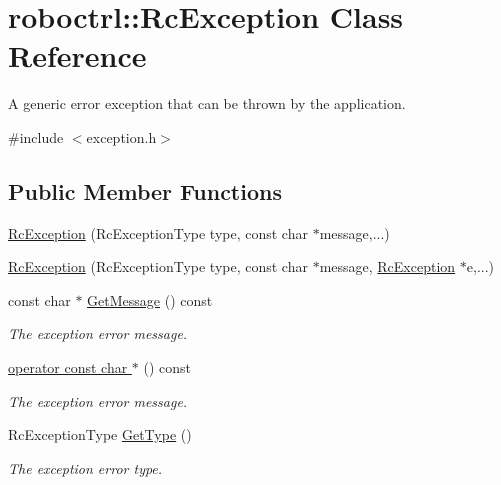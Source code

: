 \hypertarget{classroboctrl_1_1_rc_exception}{\section{roboctrl\-:\-:Rc\-Exception Class Reference}
\label{classroboctrl_1_1_rc_exception}
}


A generic error exception that can be thrown by the application.  




{\ttfamily \#include $<$exception.\-h$>$}

\subsection*{Public Member Functions}
\begin{DoxyCompactItemize}
\item 
\hyperlink{classroboctrl_1_1_rc_exception_a75ba892300f0f4f21baf59fc4a21cdb9}{Rc\-Exception} (Rc\-Exception\-Type type, const char $\ast$message,...)
\item 
\hyperlink{classroboctrl_1_1_rc_exception_a0a62b1eb8e813b6c81c6d83362e06aac}{Rc\-Exception} (Rc\-Exception\-Type type, const char $\ast$message, \hyperlink{classroboctrl_1_1_rc_exception}{Rc\-Exception} $\ast$e,...)
\item 
const char $\ast$ \hyperlink{classroboctrl_1_1_rc_exception_a8e166d8fddad6efa30639a68d221ab7d}{Get\-Message} () const 
\begin{DoxyCompactList}\small\item\em The exception error message. \end{DoxyCompactList}\item 
\hyperlink{classroboctrl_1_1_rc_exception_a96edcbe8e8340ec36710c50570e2d0d1}{operator const char $\ast$} () const 
\begin{DoxyCompactList}\small\item\em The exception error message. \end{DoxyCompactList}\item 
Rc\-Exception\-Type \hyperlink{classroboctrl_1_1_rc_exception_a6c722fbdc3dc0155d2c6066a74cf3dcc}{Get\-Type} ()
\begin{DoxyCompactList}\small\item\em The exception error type. \end{DoxyCompactList}\end{DoxyCompactItemize}
